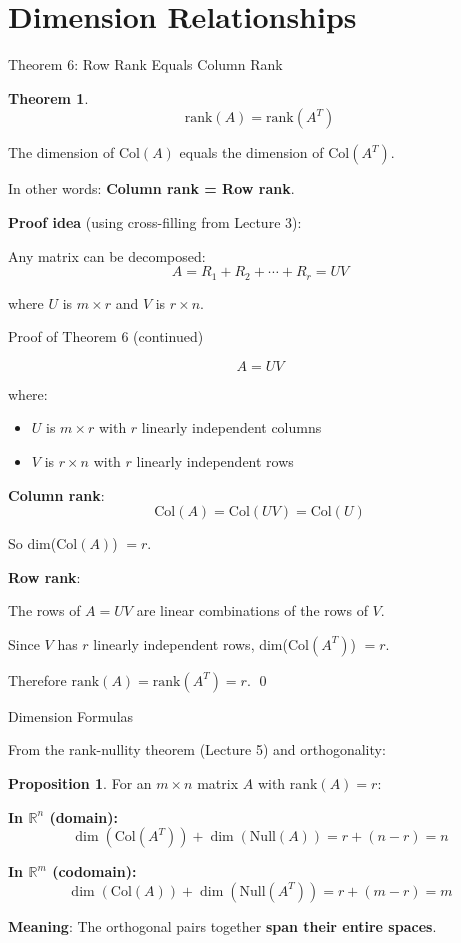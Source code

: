 \documentclass[10pt]{beamer}
\theoremstyle{definition}
\newtheorem{prop}{Proposition}[section]
\newtheorem{thm}{Theorem}[section]
\newcommand{\x}[1]{\alert{\textbf{#1}}}
\begin{document}
\section{Dimension Relationships}

\begin{frame}{Theorem 6: Row Rank Equals Column Rank}

\begin{thm}
$$\text{rank}(A) = \text{rank}(A^T)$$

The dimension of Col$(A)$ equals the dimension of Col$(A^T)$.

In other words: \x{Column rank = Row rank}.
\end{thm}

\vspace{1em}

\x{Proof idea} (using cross-filling from Lecture 3):

Any matrix can be decomposed:
$$A = R_1 + R_2 + \cdots + R_r = UV$$

where $U$ is $m \times r$ and $V$ is $r \times n$.

\end{frame}

\begin{frame}{Proof of Theorem 6 (continued)}

$$A = UV$$

where:
\begin{itemize}
\item $U$ is $m \times r$ with $r$ linearly independent columns
\item $V$ is $r \times n$ with $r$ linearly independent rows
\end{itemize}

\x{Column rank}:
$$\text{Col}(A) = \text{Col}(UV) = \text{Col}(U)$$

So dim(Col$(A)$) $= r$.

\x{Row rank}:

The rows of $A = UV$ are linear combinations of the rows of $V$.

Since $V$ has $r$ linearly independent rows, dim(Col$(A^T)$) $= r$.

Therefore $\text{rank}(A) = \text{rank}(A^T) = r$. \qed

\end{frame}

\begin{frame}{Dimension Formulas}

From the rank-nullity theorem (Lecture 5) and orthogonality:

\begin{prop}
For an $m \times n$ matrix $A$ with rank$(A) = r$:

\textbf{In $\mathbb{R}^n$ (domain):}
$$\dim(\text{Col}(A^T)) + \dim(\text{Null}(A)) = r + (n - r) = n$$

\textbf{In $\mathbb{R}^m$ (codomain):}
$$\dim(\text{Col}(A)) + \dim(\text{Null}(A^T)) = r + (m - r) = m$$
\end{prop}

\x{Meaning}: The orthogonal pairs together \x{span their entire spaces}.

\end{frame}
\end{document}
